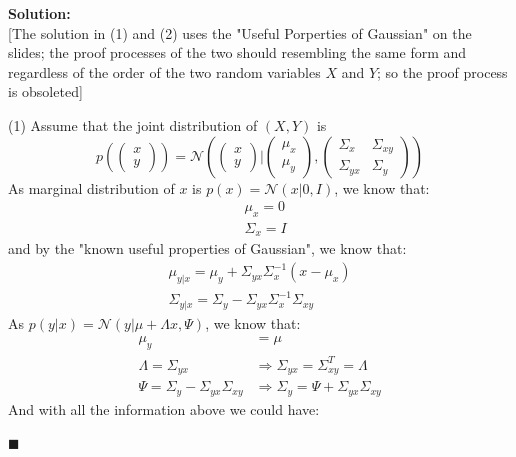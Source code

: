 \documentclass{article}
\newenvironment{solution}                               %
{\textbf{Solution:} \\}{$\blacksquare$\newline}         %
\newcommand{\leadto}{\Rightarrow}                       %
\newcommand{\Gaussian}{\mathcal{N}}                     %
\newcommand{\IdenMat}{\textit{I}}                       %
\begin{document}
    \begin{solution}
        {[}The solution in (1) and (2) uses the "Useful Porperties of Gaussian" on the slides; the proof processes of the two should resembling the same form and regardless of the order of the two random variables $X$ and $Y$; so the proof process is obsoleted{]}

        (1) Assume that the joint distribution of $(X, Y)$ is
        $$
        p(\begin{pmatrix}
            x \\ y
        \end{pmatrix}) = 
        \Gaussian(
            \begin{pmatrix}
                x \\ y
            \end{pmatrix}
            | 
            \begin{pmatrix}
                \mu_x \\ \mu_y
            \end{pmatrix}, 
            \begin{pmatrix}
                \Sigma_{x} & \Sigma_{xy} \\
                \Sigma_{yx} & \Sigma_{y}
            \end{pmatrix}
        )
        $$
        As marginal distribution of $x$ is $p(x) = \Gaussian(x | 0, \IdenMat)$, we know that: 
        \begin{align*}
            & \mu_x = 0 \\
            & \Sigma_{x} = \IdenMat
        \end{align*}
        and by the "known useful properties of Gaussian", we know that:
        \begin{align*}
            \mu_{y|x} = \mu_y + \Sigma_{yx} \Sigma_{x}^{-1}(x - \mu_x) \\
            \Sigma_{y|x} = \Sigma_{y} - \Sigma_{yx} \Sigma_{x}^{-1} \Sigma_{xy}
        \end{align*}
        As $p(y|x) = \Gaussian(y | \mu+\Lambda x, \Psi)$, we know that:
        \begin{align*}
            \mu_y &= \mu \\
            \Lambda = \Sigma_{yx} 
                &\leadto \Sigma_{yx}=\Sigma_{xy}^T=\Lambda\\
            \Psi = \Sigma_{y} - \Sigma_{yx} \Sigma_{xy}
                &\leadto \Sigma_{y} = \Psi + \Sigma_{yx} \Sigma_{xy}
        \end{align*}
        And with all the information above we could have:

\end{solution}
\end{document}
